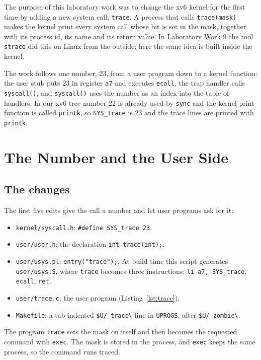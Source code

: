 \documentclass[12pt,a4paper]{article}
\begin{document}
The purpose of this laboratory work was to change the xv6 kernel for the first time by adding a new system call, \texttt{trace}. A process that calls \texttt{trace(mask)} makes the kernel print every system call whose bit is set in the mask, together with its process id, its name and its return value. In Laboratory Work 9 the tool \texttt{strace} did this on Linux from the outside; here the same idea is built inside the kernel.

The work follows one number, 23, from a user program down to a kernel function: the user stub puts 23 in register \texttt{a7} and executes \texttt{ecall}, the trap handler calls \texttt{syscall()}, and \texttt{syscall()} uses the number as an index into the table of handlers. In our xv6 tree number 22 is already used by \texttt{sync} and the kernel print function is called \texttt{printk}, so \texttt{SYS\_trace} is 23 and the trace lines are printed with \texttt{printk}.

\newpage
\section{The Number and the User Side}

\subsection{The changes}

The first five edits give the call a number and let user programs ask for it:

\begin{itemize}
  \item \texttt{kernel/syscall.h}: \texttt{\#define SYS\_trace 23}.
  \item \texttt{user/user.h}: the declaration \texttt{int trace(int);}.
  \item \texttt{user/usys.pl}: \texttt{entry("trace");}. At build time this script generates \texttt{user/usys.S}, where \texttt{trace} becomes three instructions: \texttt{li a7, SYS\_trace}, \texttt{ecall}, \texttt{ret}.
  \item \texttt{user/trace.c}: the user program (Listing~\ref{lst:trace}).
  \item \texttt{Makefile}: a tab-indented \texttt{\$U/\_trace\textbackslash} line in \texttt{UPROGS}, after \texttt{\$U/\_zombie\textbackslash}.
\end{itemize}

The program \texttt{trace} sets the mask on itself and then becomes the requested command with \texttt{exec}. The mask is stored in the process, and \texttt{exec} keeps the same process, so the command runs traced.
\end{document}

